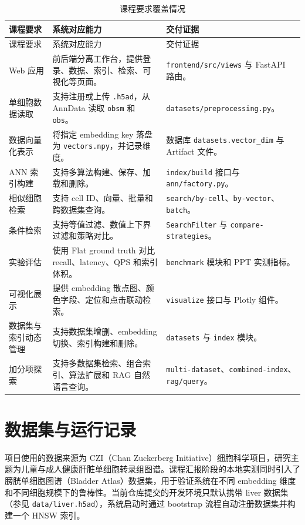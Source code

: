 \documentclass[UTF8,a4paper,12pt]{ctexrep}
\begin{document}
\begin{longtable}{L{0.22\textwidth}L{0.32\textwidth}L{0.36\textwidth}}
  \caption{课程要求覆盖情况} \\
  \toprule
  课程要求 & 系统对应能力 & 交付证据 \\
  \midrule
  \endfirsthead
  \toprule
  课程要求 & 系统对应能力 & 交付证据 \\
  \midrule
  \endhead
  Web 应用 & 前后端分离工作台，提供登录、数据、索引、检索、可视化等页面。 & \texttt{frontend/src/views} 与 FastAPI 路由。 \\
  单细胞数据读取 & 支持注册或上传 \texttt{.h5ad}，从 AnnData 读取 \texttt{obsm} 和 \texttt{obs}。 & \texttt{datasets/preprocessing.py}。 \\
  数据向量化表示 & 将指定 embedding key 落盘为 \texttt{vectors.npy}，并记录维度。 & 数据库 \texttt{datasets.vector\_dim} 与 Artifact 文件。 \\
  ANN 索引构建 & 支持多算法构建、保存、加载和删除。 & \texttt{index/build} 接口与 \texttt{ann/factory.py}。 \\
  相似细胞检索 & 支持 cell ID、向量、批量和跨数据集查询。 & \texttt{search/by-cell}、\texttt{by-vector}、\texttt{batch}。 \\
  条件检索 & 支持等值过滤、数值上下界过滤和策略对比。 & \texttt{SearchFilter} 与 \texttt{compare-strategies}。 \\
  实验评估 & 使用 Flat ground truth 对比 recall、latency、QPS 和索引体积。 & \texttt{benchmark} 模块和 PPT 实测指标。 \\
  可视化展示 & 提供 embedding 散点图、颜色字段、定位和点击联动检索。 & \texttt{visualize} 接口与 Plotly 组件。 \\
  数据集与索引动态管理 & 支持数据集增删、embedding 切换、索引构建和删除。 & \texttt{datasets} 与 \texttt{index} 模块。 \\
  加分项探索 & 支持多数据集检索、组合索引、算法扩展和 RAG 自然语言查询。 & \texttt{multi-dataset}、\texttt{combined-index}、\texttt{rag/query}。 \\
  \bottomrule
\end{longtable}

\section{数据集与运行记录}

项目使用的数据来源为 CZI（Chan Zuckerberg Initiative）细胞科学项目，研究主题为儿童与成人健康肝脏单细胞转录组图谱。课程汇报阶段的本地实测同时引入了膀胱单细胞图谱（Bladder Atlas）数据集，用于验证系统在不同 embedding 维度和不同细胞规模下的鲁棒性。当前仓库提交的开发环境只默认携带 liver 数据集（参见 \texttt{data/liver.h5ad}），系统启动时通过 bootstrap 流程自动注册数据集并构建一个 HNSW 索引。
\end{document}
